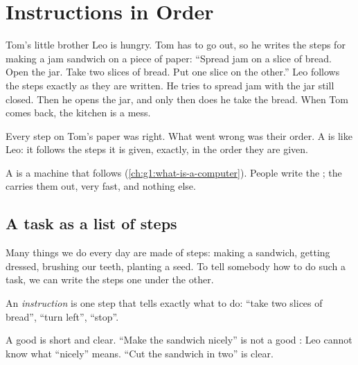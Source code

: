 \chapter{Instructions in Order}\label{ch:g1:instructions-in-order}

Tom's little brother Leo is hungry. Tom has to go out, so he writes the steps
for making a jam sandwich on a piece of paper: ``Spread jam on a slice of
bread. Open the jar. Take two slices of bread. Put one slice on the other.''
Leo follows the steps exactly as they are written. He tries to spread jam
with the jar still closed. Then he opens the jar, and only then does he take
the bread. When Tom comes back, the kitchen is a mess.

Every step on Tom's paper was right. What went wrong was their order. A
 is like Leo: it follows the steps it is given, exactly, in the order
they are given.

\begin{recall}
A  is a machine that follows 
(\cref{ch:g1:what-is-a-computer}). People write the ; the
 carries them out, very fast, and nothing else.
\end{recall}

\section{A task as a list of steps}

Many things we do every day are made of steps: making a sandwich, getting
dressed, brushing our teeth, planting a seed. To tell somebody how to do such
a task, we can write the steps one under the other.

\begin{definition}[Instruction]\label{def:g1:instructions-in-order:instruction}
An \emph{instruction} is one step that tells exactly what
to do: ``take two slices of bread'', ``turn left'', ``stop''.
\end{definition}

A good  is short and clear. ``Make the sandwich nicely'' is not a
good : Leo cannot know what ``nicely'' means. ``Cut the sandwich
in two'' is clear.

